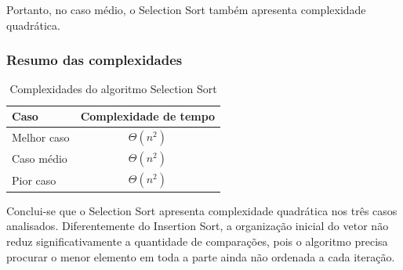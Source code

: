 Portanto, no caso médio, o Selection Sort também apresenta complexidade
quadrática.

\subsubsection{Resumo das complexidades}

\begin{table}[H]
    \centering
    \caption{Complexidades do algoritmo Selection Sort}
    \label{tab:complexidade-bubble}
    \begin{tabular}{lc}
        \hline
        \textbf{Caso} & \textbf{Complexidade de tempo} \\
        \hline
        Melhor caso & $\Theta(n^2)$ \\
        Caso médio & $\Theta(n^2)$ \\
        Pior caso & $\Theta(n^2)$ \\
        \hline
    \end{tabular}
\end{table}

Conclui-se que o Selection Sort apresenta complexidade quadrática nos
três casos analisados. Diferentemente do Insertion Sort, a organização
inicial do vetor não reduz significativamente a quantidade de comparações,
pois o algoritmo precisa procurar o menor elemento em toda a parte ainda
não ordenada a cada iteração.
